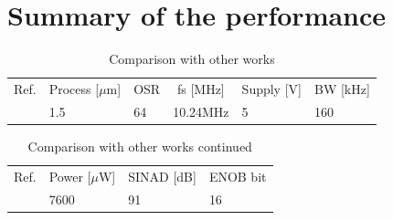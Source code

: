 \section{Summary of the performance }



\begin{table}[H]
\centering

\caption{Comparison with other works}
\label{comparsion_works}
\begin{tabular}{l|l|l|l|l|l}
\hline
\multirow{1}{*}{Ref.} & \multicolumn{1}{c|}{Process [$\mu$m]} & \multicolumn{1}{c|}{OSR} & \multicolumn{1}{c|}{fs [MHz]} & \multicolumn{1}{c|}{Supply [V]} & \multicolumn{1}{c}{BW [kHz]}  \\\cline{1-6}

            \cite{ref_1} & 1.5 & 64 & 10.24MHz & 5 & 160\\

\hline            
\end{tabular}
\end{table}


\begin{table}[H]
\centering

\caption{Comparison with other works continued}
\label{comparsion_works_2}
\begin{tabular}{l|l|l|l}
\hline
\multirow{1}{*}{Ref.} & \multicolumn{1}{c|}{Power [$\mu$W]} & \multicolumn{1}{c|}{SINAD [dB]} & \multicolumn{1}{c}{ENOB bit}\\\cline{1-4}

        \cite{ref_1} & 7600 & 91 & 16\\
\hline            
\end{tabular}
\end{table}